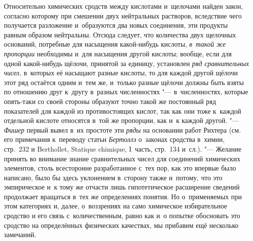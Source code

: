 Относительно химических сродств между кислотами и~щелочами найден закон,
согласно которому при смешении двух нейтральных растворов, вследствие чего
получается разложение и~образуются два новых соединения, эти продукты равным
образом нейтральны. Отсюда следует, что количества двух щелочных оснований,
потребные для насыщения какой-нибудь кислоты, {\em в~такой же пропорции}
необходимы и~для насыщения другой кислоты; вообще, если для одной какой-нибудь
щёлочи, принятой за единицу, установлен {\em ряд сравнительных чисел,}
в~которых её насыщают разные кислоты, то для каждой другой щёлочи этот ряд
остаётся одним и~тем же, и~только разные щёлочи должны быть взяты по отношению
друг к~другу в~разных численностях "--- в~численностях, которые опять-таки со
своей стороны образуют точно такой же постоянный ряд показателей для каждой из
противостоящих кислот, так как они тоже к~каждой отдельной кислоте относятся
в~той же пропорции, как и~к каждой другой. "--- {\em Фишер} первый вывел
в~их простоте эти {\em ряды} на основании работ Рихтера (см. его примечания
к~переводу статьи {\em Бертоллэ} о~законах сродства в~химии, стр.~232 и
Ber\-thol\-let, Sta\-tique chi\-mique, I~часть, стр.~134 и~сл.). "--- Желание
принять во внимание знание сравнительных чисел для соединений химических
элементов, столь всесторонне разработанное с~тех пор, как это впервые было
написано, было бы здесь уклонением в~сторону также и~потому, что это
эмпирическое и~к тому же отчасти лишь гипотетическое расширение сведений
продолжает вращаться в~тех же определениях понятия. Но о~применяемых при этом
категориях и, далее, о~воззрениях на само химическое избирательное сродство и
его связь с~количественным, равно как и~о попытке обосновать это сродство на
определённых физических качествах, мы прибавим ещё несколько замечаний.

